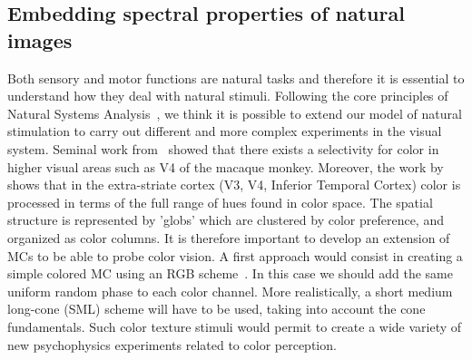 \documentclass[a4paper,11pt]{article}%
\begin{document}
\subsection{Embedding spectral properties of natural images}
Both sensory and motor functions are natural tasks and therefore it is essential to understand how they deal with natural stimuli. Following the core principles of Natural Systems Analysis~\citep{Geisler08}, we think it is possible to extend our model of natural stimulation to carry out different and more complex experiments in the visual system. Seminal work from~\citep{Zeki83} showed that there exists a selectivity for color in higher visual areas such as V4 of the macaque monkey. Moreover,  the work by~\citep{Conway07}  shows that in the extra-striate cortex (V3, V4, Inferior Temporal Cortex) color is processed in terms of the full range of hues found in color space. The spatial structure is represented by  'globs' which are clustered by color preference, and organized as color columns. It is therefore important to develop an extension of MCs to be able to probe color vision. A first approach would consist in  creating a simple colored MC using an RGB scheme~\citep{Galerne10}. In this case we should add the same uniform random phase to each color channel. More realistically, a short medium long-cone (SML) scheme will have to be used, taking into account the cone fundamentals. Such color texture stimuli would permit to create a wide variety of new psychophysics experiments related to color perception. %
%
\end{document}
